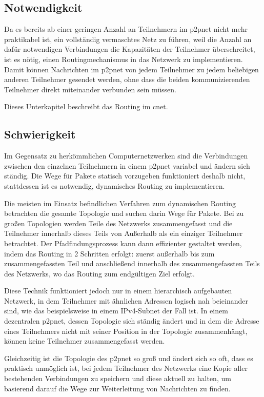 
\subsection{Notwendigkeit}
Da es bereits ab einer geringen Anzahl an Teilnehmern im \gls{p2pnet} nicht mehr praktikabel ist,
ein vollständig vermaschtes Netz zu führen, weil die Anzahl an dafür notwendigen Verbindungen die
Kapazitäten der Teilnehmer überschreitet, ist es nötig, einen Routingmechanismus in das Netzwerk
zu implementieren. Damit können Nachrichten im \gls{p2pnet} von jedem Teilnehmer zu jedem beliebigen
anderen Teilnehmer gesendet werden, ohne dass die beiden kommunizierenden Teilnehmer direkt
miteinander verbunden sein müssen.

Dieses Unterkapitel beschreibt das Routing im \gls{cnet}.

\subsection{Schwierigkeit}
Im Gegensatz zu herkömmlichen Computernetzwerken sind die Verbindungen zwischen den einzelnen
Teilnehmern in einem \gls{p2pnet} variabel und ändern sich ständig. Die Wege für Pakete statisch
vorzugeben funktioniert deshalb nicht, stattdessen ist es notwendig, dynamisches Routing zu
implementieren.

Die meisten im Einsatz befindlichen Verfahren zum dynamischen Routing betrachten die gesamte
Topologie und suchen darin Wege für Pakete. Bei zu großen Topologien werden Teile des Netzwerks
zusammengefasst und die Teilnehmer innerhalb dieses Teils von Außerhalb als ein einziger Teilnehmer
betrachtet. Der Pfadfindungsprozess kann dann effizienter gestaltet werden, indem das Routing in
2 Schritten erfolgt: zuerst außerhalb bis zum zusammengefassten Teil und anschließend innerhalb
des zusammengefassten Teils des Netzwerks, wo das Routing zum endgültigen Ziel erfolgt.

Diese Technik funktioniert jedoch nur in einem hierarchisch aufgebauten Netzwerk, in dem Teilnehmer
mit ähnlichen Adressen logisch nah beieinander sind, wie das beispielsweise in einem IPv4-Subnet
der Fall ist. In einem dezentralen \gls{p2pnet}, dessen Topologie sich ständig ändert und in dem
die Adresse eines Teilnehmers nicht mit seiner Position in der Topologie zusammenhängt, können
keine Teilnehmer zusammengefasst werden.

Gleichzeitig ist die Topologie des \gls{p2pnet} so groß und ändert sich so oft, dass es praktisch 
unmöglich ist, bei jedem Teilnehmer des Netzwerks eine Kopie aller bestehenden Verbindungen zu
speichern und diese aktuell zu halten, um basierend darauf die Wege zur Weiterleitung von
Nachrichten zu finden.


